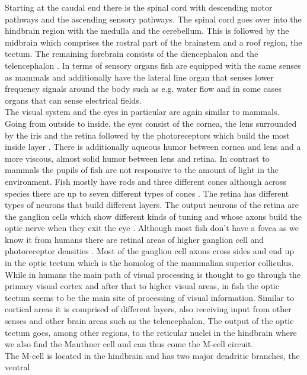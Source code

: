 \documentclass[a4paper,10pt,hidelinks]{scrreprt}
\begin{document}
	Starting at the caudal end there is the spinal cord with descending motor pathways and the 
	ascending sensory pathways.
	The spinal cord goes over into the hindbrain region with the medulla and the cerebellum.
	This is followed by the midbrain which comprises the rostral part of the brainstem and a roof 
	region, the tectum.
	The remaining forebrain consists of the diencephalon and the telencephalon \citep{Butler2011}.
	In terms of sensory organs fish are equipped with the same senses as mammals and additionally 
	have the lateral line organ that senses lower frequency signals around the body such as e.g. 
	water flow and in some cases organs that can sense electrical fields.\\
    The visual system and the eyes in particular are again similar to mammals.
	Going from outside to inside, the eyes consist of the cornea, the lens surrounded by the iris and the retina followed by the photoreceptors which build the most inside layer \citep{Kroeger2011}.
    There is additionally aqueous humor between cornea and lens and a more viscous, almost solid humor between lens and retina.
	In contrast to mammals the pupils of fish are not responsive to the amount of light in the 
	environment.
	Fish mostly have rods and three different cones although across species there are up to seven 
	different types of cones \citep[Chapter~7]{Cronin2017}.
	The retina has different types of neurons that build different layers.
	The output neurons of the retina are the ganglion cells which show different kinds of tuning \citep{Antinucci2018}
	and whose axons build the optic nerve when they exit the eye \citep{Levine2011}.
	Although most fish don't have a fovea as we know it from humans there are retinal areas of 
	higher ganglion cell and photoreceptor densities \citep{Pita2015}.
	Most of the ganglion cell axons cross sides and end up in the optic tectum which is the 
	homolog of the mammalian superior colliculus.
	While in humans the main path of visual processing is thought to go through the primary visual cortex and after that to higher visual areas, in fish the optic tectum seems to be the main site of processing of visual information.
	Similar to cortical areas it is comprised of different layers, also receiving input from other 
	senses and other brain areas such as the telencephalon.
	The output of the optic tectum goes, among other regions, to the reticular nuclei in the 
	hindbrain where we also find the Mauthner cell and can thus come the M-cell circuit.\\
	The M-cell is located in the hindbrain and has two major dendritic branches, the ventral 
\end{document}
